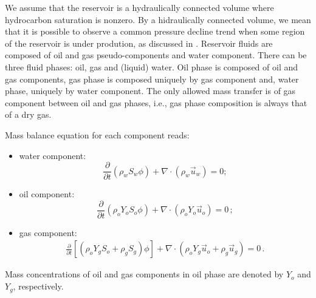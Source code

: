 \documentclass[authoryear,preprint,review,11pt]{elsarticle}
\begin{document}

We assume that the reservoir is a hydraulically connected volume where hydrocarbon saturation is nonzero. By a hidraulically connected volume, we mean that it is possible to observe a common pressure decline trend when some region of the reservoir is under prodution, as discussed in \cite{dakepractice}. Reservoir fluids are composed of oil and gas pseudo-components and water component. There can be three fluid phases: oil, gas and (liquid) water. Oil phase is composed of oil and gas components, gas phase is composed uniquely by gas component and, water phase, uniquely by water component. The only allowed mass transfer is of gas component between oil and gas phases, i.e., gas phase composition is always that of a dry gas.


Mass balance equation for each component reads:

\begin{itemize}
\item water component:
\begin{equation}\label{eq: Sw1}
\frac{\partial}{\partial t} \left( \rho_w S_w \phi \right) +\nabla \cdot \left( \rho_w \vec{u}_w \right) = 0 ;
\end{equation}

\item oil component:
\begin{equation}\label{eq: So1}
\frac{\partial}{\partial t}\left( \rho_o Y_o S_o \phi \right) + \nabla \cdot \left( \rho_o Y_o \vec{u}_o \right) = 0 \, ;
\end{equation}

\item gas component:
\begin{equation}\label{eq: Sg1}
\begin{split}
\frac{\partial}{\partial t} \left[\left( \rho_o Y_g S_o + \rho_g S_g\right)\phi \right] + \nabla  \cdot \left( \rho_o Y_g \vec{u}_o + \rho_g \vec{u}_g\right) = 0\, .
\end{split}
\end{equation}
\end{itemize}
Mass concentrations of oil and gas components in oil phase are denoted by $Y_o$ and $Y_g$, respectively. 
\end{document}
